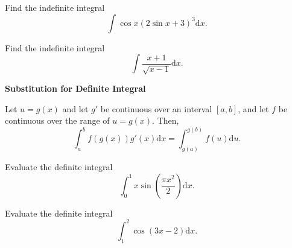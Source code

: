 


\begin{example}

Find the indefinite integral \[\int \cos x(2\sin x+3)^3\mathrm{d} x.\]

\end{example}
\vspace*{6\baselineskip}

\begin{example}

Find the indefinite integral
\[\int \frac{x+1}{\sqrt{x-1}}\mathrm{d} x.\]

\end{example}
\vspace*{6\baselineskip}

\begin{theorem}

\textbf{Substitution for Definite Integral}

Let \(u=g(x)\) and let \(g'\) be continuous over an interval \([a,b]\),
and let \(f\) be continuous over the range of \(u=g(x).\) Then,
\[\int^b_af(g(x))g'(x)\mathrm{d} x=\int^{g(b)}_{g(a)}f(u)\mathrm{d} u.\]

\end{theorem}

\begin{example}

Evaluate the definite integral
\[\int^1_0 x\sin\left(\dfrac{\pi x^2}{2}\right)\mathrm{d} x.\]

\end{example}
\vspace*{6\baselineskip}

\begin{example}

Evaluate the definite integral \[\int^2_1 \cos(3x-2)\mathrm{d} x.\]

\end{example}
\vspace*{6\baselineskip}



